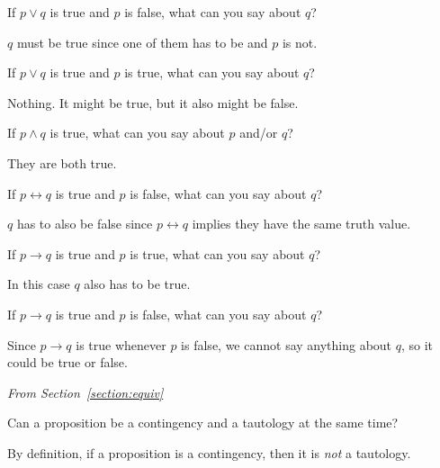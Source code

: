 \begin{requ}
If $p\vee q$ is true and $p$ is false, what can you say about $q$?
\begin{requanswer}
$q$ must be true since one of them has to be and $p$ is not.
\end{requanswer}
\end{requ}

\begin{requ}
If $p\vee q$ is true and $p$ is true, what can you say about $q$?
\begin{requanswer}
Nothing. It might be true, but it also might be false.
\end{requanswer}
\end{requ}

\begin{requ}
If $p\wedge q$ is true, what can you say about $p$ and/or $q$?
\begin{requanswer}
They are both true.
\end{requanswer}
\end{requ}

\begin{requ}
If $p\leftrightarrow q$ is true and $p$ is false, what can you say about $q$?
\begin{requanswer}
$q$ has to also be false since $p\leftrightarrow q$ implies they have the same truth value.
\end{requanswer}
\end{requ}

\begin{requ}
If $p\rightarrow q$ is true and $p$ is true, what can you say about $q$?
\begin{requanswer}
In this case $q$ also has to be true.
\end{requanswer}
\end{requ}

\begin{requ}
If $p\rightarrow q$ is true and $p$ is false, what can you say about $q$?
\begin{requanswer}
Since $p\rightarrow q$ is true whenever $p$ is false, we cannot say anything about $q$,
so it could be true or false.
\end{requanswer}
\end{requ}

\medskip

\noindent
{\em From Section~\ref{section:equiv}}

\begin{requ}
Can a proposition be a contingency and a tautology at the same time?
\begin{requanswer}
By definition, if a proposition is a contingency, then it is {\em not}
a tautology.
\end{requanswer}
\end{requ}

